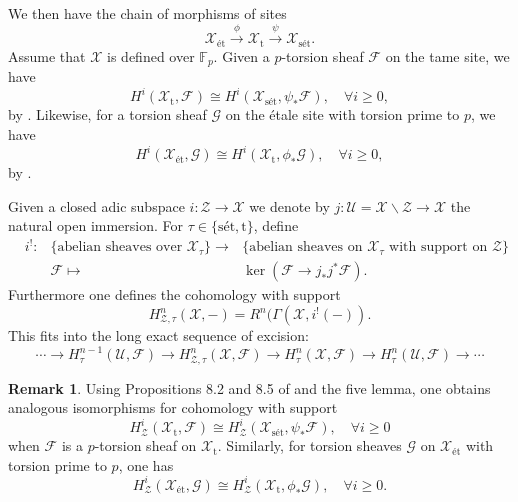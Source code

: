 \documentclass{amsart}
\def\et{\textrm{\'et}}
\theoremstyle{definition}
\newtheorem{remark}[theorem]{Remark}
\newcommand\tame{\textrm{t}}
\newcommand\sett{\textrm{s\'et}}
\numberwithin{equation}{section}
\begin{document}
We then have the chain of morphisms of sites
 \[
 \mathcal{X}_\et\xrightarrow{\phi} \mathcal{X}_{\tame}\xrightarrow{\psi} \mathcal{X}_{\sett}.
 \]
Assume that $\mathcal{X}$ is defined over $\mathbb{F}_p$. Given a $p$-torsion sheaf $\mathcal{F}$ on the tame site, we have
\[
H^i(\mathcal{X}_\tame, \mathcal{F}) \cong H^i(\mathcal{X}_\sett, \psi_*\mathcal{F}), \quad \forall i \geq 0,
\]
by \cite[Proposition 8.5]{HTame}.  Likewise, for a torsion sheaf $\mathcal{G}$ on the \'etale site with torsion prime to $p$, we have
 \[
 H^i(\mathcal{X}_\et, \mathcal{G}) \cong H^i(\mathcal{X}_\tame, \phi_* \mathcal{G}), \quad \forall i \geq 0,
 \]
 by \cite[Proposition 8.2]{HTame}.
 

Given a closed adic subspace $i:\mathcal{Z}\to \mathcal{X}$ we denote by $j:\mathcal{U}=\mathcal{X}\backslash \mathcal{Z}\to \mathcal{X}$ the natural open immersion. For $\tau\in \{\sett, \tame\}$, define 
\[
\begin{aligned}
	&i^!:&\{\textrm{abelian sheaves over }\mathcal{X}_\tau\}\to &\{\textrm{abelian sheaves on }\mathcal{X}_\tau \textrm{ with support on } \mathcal{Z}\}\\
	&&\mathcal{F}\mapsto &\ker (\mathcal{F}\to j_*j^*\mathcal{F}).
\end{aligned}
\]
Furthermore one defines the cohomology with support 
\[
H^n_{\mathcal{Z},\tau}(\mathcal{X},-)=R^n(\Gamma(\mathcal{X},i^!(-)).
\]
This fits into the long exact sequence of excision:
\begin{equation}\label{eq:Excision}
	\cdots \to H^{n-1}_\tau(\mathcal{U}, \mathcal{F}) \to H^n_{\mathcal{Z},\tau}(\mathcal{X}, \mathcal{F}) \to H^n_\tau(\mathcal{X}, \mathcal{F}) \to H^n_\tau(\mathcal{U}, \mathcal{F}) \to \cdots
\end{equation}

\begin{remark}\label{rmk:tamevsstronglyet}
	Using Propositions 8.2 and 8.5 of \cite{HTame} and the five lemma, one obtains analogous isomorphisms for cohomology with support
	 \[
	H^i_{\mathcal{Z}}(\mathcal{X}_\tame,\mathcal{F})\cong H^i_{\mathcal{Z}}(\mathcal{X}_\sett,\psi_*\mathcal{F}), \quad \forall i\geq 0
	\]  
	when $\mathcal{F}$ is a $p$-torsion sheaf on $\mathcal{X}_\tame$. Similarly, for torsion sheaves $\mathcal{G}$ on $\mathcal{X}_\et$ with torsion prime to $p$, one has
	\[
	H^i_{\mathcal{Z}}(\mathcal{X}_\et,\mathcal{G})\cong H^i_{\mathcal{Z}}(\mathcal{X}_\tame, \phi_* \mathcal{G}), \quad \forall i\geq 0.
	\]
\end{remark}
\end{document}
